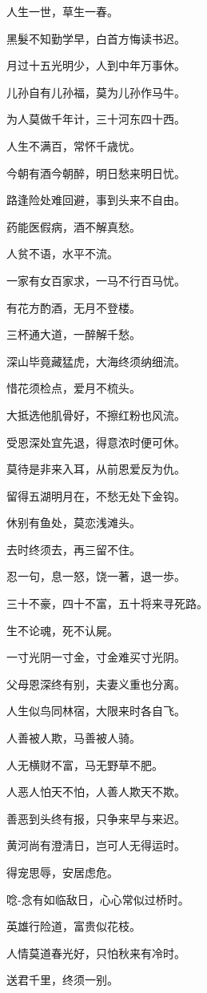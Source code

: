 \documentclass[12pt,oneside]{book}
\begin{document}
人生一世，草生一春。

黑髮不知勤学早，白首方悔读书迟。

月过十五光明少，人到中年万事休。

儿孙自有儿孙福，莫为儿孙作马牛。

为人莫做千年计，三十河东四十西。

人生不满百，常怀千歳忧。

今朝有酒今朝醉，明日愁来明日忧。

路逢险处难回避，事到头来不自由。

药能医假病，酒不解真愁。

人贫不语，水平不流。

一家有女百家求，一马不行百马忧。

有花方酌酒，无月不登楼。

三杯通大道，一醉解千愁。

深山毕竟藏猛虎，大海终须纳细流。

惜花须检点，爱月不梳头。

大抵选他肌骨好，不擦红粉也风流。

受恩深处宜先退，得意浓时便可休。

莫待是非来入耳，从前恩爱反为仇。

留得五湖明月在，不愁无处下金钩。

休别有鱼处，莫恋浅滩头。

去时终须去，再三留不住。

忍一句，息一怒，饶一著，退一歩。

三十不豪，四十不富，五十将来寻死路。

生不论魂，死不认屍。

一寸光阴一寸金，寸金难买寸光阴。

父母恩深终有别，夫妻义重也分离。

人生似鸟同林宿，大限来时各自飞。

人善被人欺，马善被人骑。

人无横财不富，马无野草不肥。

人恶人怕天不怕，人善人欺天不欺。

善恶到头终有报，只争来早与来迟。

黄河尚有澄淸日，岂可人无得运时。

得宠思辱，安居虑危。

唸-{念}有如临敌日，心心常似过桥时。

英雄行险道，富贵似花枝。

人情莫道春光好，只怕秋来有冷时。

送君千里，终须一别。
\end{document}
